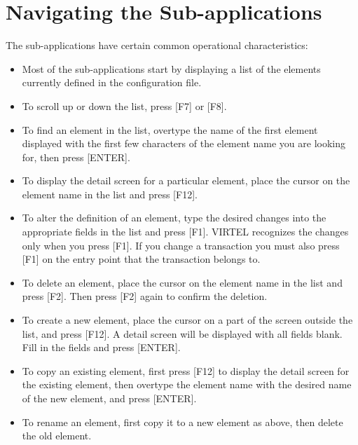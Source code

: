 \documentclass[letterpaper,10pt,english]{sphinxmanual}
\begin{document}
\section{Navigating the Sub-applications}
\label{\detokenize{connectivity_guide:navigating-the-sub-applications}}
The sub-applications have certain common operational characteristics:
\begin{itemize}
\item {} 
Most of the sub-applications start by displaying a list of the elements currently defined in the configuration file.

\item {} 
To scroll up or down the list, press {[}F7{]} or {[}F8{]}.

\item {} 
To find an element in the list, overtype the name of the first element displayed with the first few characters of the element name you are looking for, then press {[}ENTER{]}.

\item {} 
To display the detail screen for a particular element, place the cursor on the element name in the list and press {[}F12{]}.

\item {} 
To alter the definition of an element, type the desired changes into the appropriate fields in the list and press {[}F1{]}. VIRTEL recognizes the changes only when you press {[}F1{]}. If you change a transaction you must also press {[}F1{]} on the entry point that the transaction belongs to.

\item {} 
To delete an element, place the cursor on the element name in the list and press {[}F2{]}. Then press {[}F2{]} again to confirm the deletion.

\item {} 
To create a new element, place the cursor on a part of the screen outside the list, and press {[}F12{]}. A detail screen will be displayed with all fields blank. Fill in the fields and press {[}ENTER{]}.

\item {} 
To copy an existing element, first press {[}F12{]} to display the detail screen for the existing element, then overtype the element name with the desired name of the new element, and press {[}ENTER{]}.

\item {} 
To rename an element, first copy it to a new element as above, then delete the old element.

\end{itemize}
\end{document}
